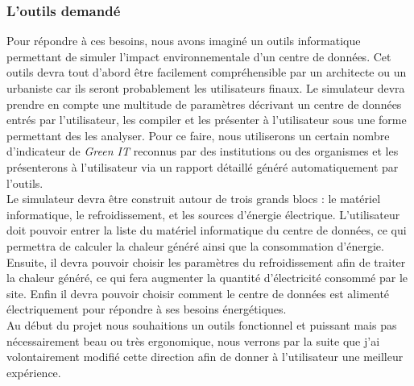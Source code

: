 \subsubsection{L'outils demandé}
Pour répondre à ces besoins, nous avons imaginé un outils informatique permettant de simuler l'impact environnementale d'un centre de données. Cet outils devra tout d'abord être facilement compréhensible par un architecte ou un urbaniste car ils seront probablement les utilisateurs finaux. Le simulateur devra prendre en compte une multitude de paramètres décrivant un centre de données entrés par l'utilisateur, les compiler et les présenter à l'utilisateur sous une forme permettant des les analyser. Pour ce faire, nous utiliserons un certain nombre d'indicateur de \emph{Green IT} reconnus par des institutions ou des organismes et les présenterons à l'utilisateur via un rapport détaillé généré automatiquement par l'outils.\\

Le simulateur devra être construit autour de trois grands blocs : le matériel informatique, le refroidissement, et les sources d'énergie électrique. L'utilisateur doit pouvoir entrer la liste du matériel informatique du centre de données, ce qui permettra de calculer la chaleur généré ainsi que la consommation d'énergie. Ensuite, il devra pouvoir choisir les paramètres du refroidissement afin de traiter la chaleur généré, ce qui fera augmenter la quantité d'électricité consommé par le site. Enfin il devra pouvoir choisir comment le centre de données est alimenté électriquement pour répondre à ses besoins énergétiques.\\

Au début du projet nous souhaitions un outils fonctionnel et puissant mais pas nécessairement beau ou très ergonomique, nous verrons par la suite que j'ai volontairement modifié cette direction afin de donner à l'utilisateur une meilleur expérience.
